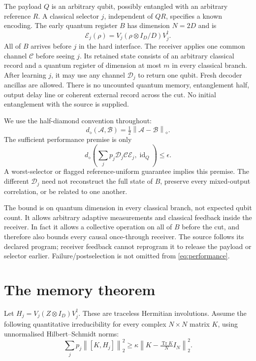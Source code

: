 \documentclass[11pt]{article}
\newcommand{\Tr}{\operatorname{Tr}}
\newcommand{\id}{\operatorname{id}}
\newcommand{\dd}{d_{\diamond}}
\newcommand{\norm}[1]{\left\lVert#1\right\rVert}
\begin{document}
The payload $Q$ is an arbitrary qubit, possibly entangled with an arbitrary
reference $R$. A classical selector $j$, independent of $QR$, specifies a known
encoding. The early quantum register $B$ has dimension $N=2D$ and is
\begin{equation}
 \mathcal E_j(\rho)=V_j(\rho\otimes I_D/D)V_j^\dagger. \label{eq:encode}
\end{equation}
All of $B$ arrives before $j$ in the hard interface. The receiver applies one
common channel $\mathcal C$ before seeing $j$. Its retained state consists of an
arbitrary classical record and a quantum register of dimension at most $m$ in
every classical branch. After learning $j$, it may use any channel $\mathcal D_j$
to return one qubit. Fresh decoder ancillas are allowed. There is no uncounted
quantum memory, entanglement half, output delay line or coherent external record
across the cut. No initial entanglement with the source is supplied.

We use the half-diamond convention throughout:
\begin{equation}
 \dd(\mathcal A,\mathcal B)=\tfrac12\norm{\mathcal A-\mathcal B}_{\diamond}.
\end{equation}
The sufficient performance premise is only
\begin{equation}
 \dd\left(\sum_jp_j\mathcal D_j\mathcal C\mathcal E_j,\id_Q\right)
 \le\epsilon. \label{eq:performance}
\end{equation}
A worst-selector or flagged reference-uniform guarantee implies this premise.
The different $\mathcal D_j$ need not reconstruct the full state of $B$, preserve
every mixed-output correlation, or be related to one another.

The bound is on quantum dimension in every classical branch, not expected
qubit count. It allows arbitrary adaptive measurements and classical feedback
inside the receiver. In fact it allows a collective operation on all of $B$
before the cut, and therefore also bounds every causal once-through receiver.
The source follows its declared program; receiver feedback cannot reprogram it
to release the payload or selector earlier. Failure/postselection is not omitted
from \eqref{eq:performance}.

\section{The memory theorem}

Let $H_j=V_j(Z\otimes I_D)V_j^\dagger$. These are traceless Hermitian
involutions. Assume the following quantitative irreducibility for every complex
$N\times N$ matrix $K$, using unnormalised Hilbert--Schmidt norms:
\begin{equation}
 \sum_jp_j\norm{[K,H_j]}_2^2\ge
 \kappa\norm{K-\tfrac{\Tr K}{N}I_N}_2^2. \label{eq:gap}
\end{equation}
\end{document}

